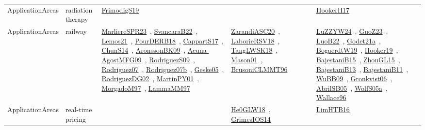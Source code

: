 {\begin{longtable}{lp{3cm}>{\raggedright\arraybackslash}p{6cm}>{\raggedright\arraybackslash}p{6cm}>{\raggedright\arraybackslash}p{8cm}}
ApplicationAreas & radiation therapy & \href{../works/FrimodigS19.pdf}{FrimodigS19}~\cite{FrimodigS19} &  & \href{../works/HookerH17.pdf}{HookerH17}~\cite{HookerH17}\\
ApplicationAreas & railway & \href{../works/MarliereSPR23.pdf}{MarliereSPR23}~\cite{MarliereSPR23}, \href{../works/SvancaraB22.pdf}{SvancaraB22}~\cite{SvancaraB22}, \href{../works/Lemos21.pdf}{Lemos21}~\cite{Lemos21}, \href{../works/PourDERB18.pdf}{PourDERB18}~\cite{PourDERB18}, \href{../works/CappartS17.pdf}{CappartS17}~\cite{CappartS17}, \href{../works/ChunS14.pdf}{ChunS14}~\cite{ChunS14}, \href{../works/AronssonBK09.pdf}{AronssonBK09}~\cite{AronssonBK09}, \href{../works/Acuna-AgostMFG09.pdf}{Acuna-AgostMFG09}~\cite{Acuna-AgostMFG09}, \href{../works/RodriguezS09.pdf}{RodriguezS09}~\cite{RodriguezS09}, \href{../works/Rodriguez07.pdf}{Rodriguez07}~\cite{Rodriguez07}, \href{../works/Rodriguez07b.pdf}{Rodriguez07b}~\cite{Rodriguez07b}, \href{../works/Geske05.pdf}{Geske05}~\cite{Geske05}, \href{../works/RodriguezDG02.pdf}{RodriguezDG02}~\cite{RodriguezDG02}, \href{../works/MartinPY01.pdf}{MartinPY01}~\cite{MartinPY01}, \href{../works/MorgadoM97.pdf}{MorgadoM97}~\cite{MorgadoM97}, \href{../works/LammaMM97.pdf}{LammaMM97}~\cite{LammaMM97} & \href{../works/ZarandiASC20.pdf}{ZarandiASC20}~\cite{ZarandiASC20}, \href{../works/LaborieRSV18.pdf}{LaborieRSV18}~\cite{LaborieRSV18}, \href{../works/TangLWSK18.pdf}{TangLWSK18}~\cite{TangLWSK18}, \href{../works/Mason01.pdf}{Mason01}~\cite{Mason01}, \href{../works/BrusoniCLMMT96.pdf}{BrusoniCLMMT96}~\cite{BrusoniCLMMT96} & \href{../works/LuZZYW24.pdf}{LuZZYW24}~\cite{LuZZYW24}, \href{../works/GuoZ23.pdf}{GuoZ23}~\cite{GuoZ23}, \href{../works/LuoB22.pdf}{LuoB22}~\cite{LuoB22}, \href{../works/Godet21a.pdf}{Godet21a}~\cite{Godet21a}, \href{../works/BogaerdtW19.pdf}{BogaerdtW19}~\cite{BogaerdtW19}, \href{../works/Hooker19.pdf}{Hooker19}~\cite{Hooker19}, \href{../works/BajestaniB15.pdf}{BajestaniB15}~\cite{BajestaniB15}, \href{../works/ZhouGL15.pdf}{ZhouGL15}~\cite{ZhouGL15}, \href{../works/BajestaniB13.pdf}{BajestaniB13}~\cite{BajestaniB13}, \href{../works/BajestaniB11.pdf}{BajestaniB11}~\cite{BajestaniB11}, \href{../works/WuBB09.pdf}{WuBB09}~\cite{WuBB09}, \href{../works/Gronkvist06.pdf}{Gronkvist06}~\cite{Gronkvist06}, \href{../works/AbrilSB05.pdf}{AbrilSB05}~\cite{AbrilSB05}, \href{../works/WolfS05a.pdf}{WolfS05a}~\cite{WolfS05a}, \href{../works/Wallace96.pdf}{Wallace96}~\cite{Wallace96}\\
ApplicationAreas & real-time pricing &  & \href{../works/He0GLW18.pdf}{He0GLW18}~\cite{He0GLW18}, \href{../works/GrimesIOS14.pdf}{GrimesIOS14}~\cite{GrimesIOS14} & \href{../works/LimHTB16.pdf}{LimHTB16}~\cite{LimHTB16}\\

\end{longtable}}
